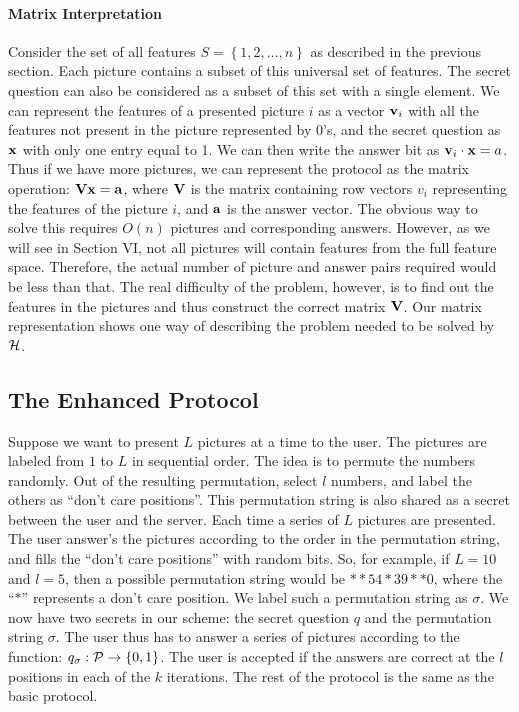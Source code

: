 \documentclass{llncs}
\begin{document}
\paragraph*{Matrix Interpretation}Consider the set of all features $S = \left\{ {1,2, \ldots ,n} \right\}$ as described in the previous section. Each picture contains a subset of this universal set of features. The secret question can also be considered as a subset of this set with a single element. We can represent the features of a presented picture $i$ as a vector ${\bf{v}}_i$ with all the features not present in the picture represented by 0's, and the secret question as ${\bf{x}}$ with only one entry equal to 1. We can then write the answer bit as ${\bf{v}}_i  \cdot {\bf{x}} = a$. Thus if we have more pictures, we can represent the protocol as the matrix operation: ${\bf{Vx}} = {\bf{a}}$, where ${\bf{V}}$ is the matrix containing row vectors $v_i$ representing the features of the picture $i$, and ${\bf{a}}$ is the answer vector. The obvious way to solve this requires $O\left( n \right)$ pictures and corresponding answers. However, as we will see in Section VI, not all pictures will contain features from the full feature space. Therefore, the actual number of picture and answer pairs required would be less than that. The real difficulty of the problem, however, is to find out the features in the pictures and thus construct the correct matrix ${\bf{V}}$. Our matrix representation shows one way of describing the problem needed to be solved by ${\cal H}$.
\subsection{The Enhanced Protocol} 
Suppose we want to present $L$ pictures at a time to the user. The pictures are labeled from $1$ to $L$ in sequential order. The idea is to permute the numbers randomly. Out of the resulting permutation, select $l$ numbers, and label the others as ``don't care positions''. This permutation string is also shared as a secret between the user and the server. Each time a series of $L$ pictures are presented. The user answer's the pictures according to the order in the permutation string, and fills the ``don't care positions'' with random bits. So, for example, if $L=10$ and $l=5$, then a possible permutation string would be $**54*39**0$, where the ``$*$'' represents a don't care position. We label such a permutation string as $\sigma $. We now have two secrets in our scheme: the secret question $q$ and the permutation string $\sigma $. The user thus has to answer a series of pictures according to the function: $q_\sigma  :{\cal P} \to \left\{ {0,1} \right\}$. The user is accepted if the answers are correct at the $l$ positions in each of the $k$ iterations. The rest of the protocol is the same as the basic protocol.
\end{document}
